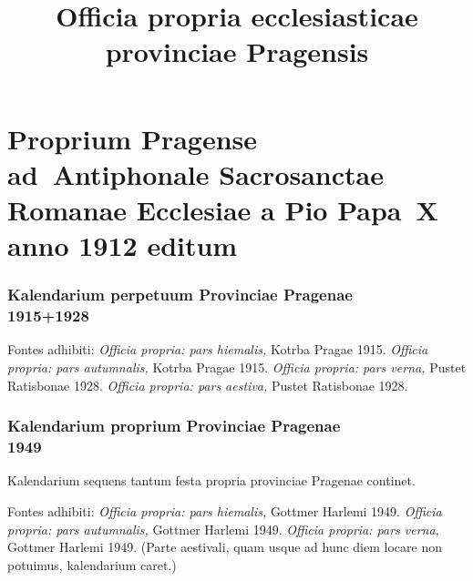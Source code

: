\documentclass[12pt, a5paper, twoside]{book}
\title{Officia propria ecclesiasticae provinciae Pragensis}
\begin{document}
\pagestyle{empty}

\setlength{\parindent}{0.5cm}

\maketitle

\cleardoublepage

\pagestyle{plain}



\part{Proprium Pragense ad~Antiphonale Sacrosanctae Romanae Ecclesiae
  a Pio Papa~X anno 1912 editum}

\section*{Kalendarium perpetuum Provinciae Pragenae\\1915+1928}

{\footnotesize
  Fontes adhibiti:
  \emph{Officia propria: pars hiemalis,} Kotrba Pragae 1915.
  \emph{Officia propria: pars autumnalis,} Kotrba Pragae 1915.
  \emph{Officia propria: pars verna,} Pustet Ratisbonae 1928.
  \emph{Officia propria: pars aestiva,} Pustet Ratisbonae 1928.
}


\cleardoublepage

\section*{Kalendarium proprium Provinciae Pragenae\\1949}

{\footnotesize
  Kalendarium sequens tantum festa propria provinciae Pragenae
  continet.

  Fontes adhibiti:
  \emph{Officia propria: pars hiemalis,} Gottmer Harlemi 1949.
  \emph{Officia propria: pars autumnalis,} Gottmer Harlemi 1949.
  \emph{Officia propria: pars verna,} Gottmer Harlemi 1949.
  (Parte aestivali, quam usque ad hunc diem locare non potuimus,
  kalendarium caret.)
}


\cleardoublepage







\vfill
\clearpage
\end{document}
